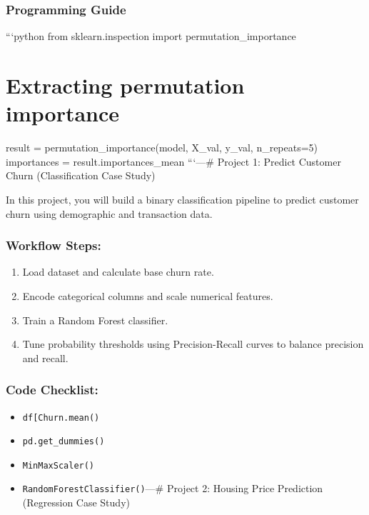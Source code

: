 \subsubsection{Programming Guide}\label{programming-guide-23}

```python from sklearn.inspection import permutation\_importance

\section{Extracting permutation
importance}\label{extracting-permutation-importance}

result = permutation\_importance(model, X\_val, y\_val, n\_repeats=5)
importances = result.importances\_mean ```\n\n---\n\n\# Project 1:
Predict Customer Churn (Classification Case Study)

In this project, you will build a binary classification pipeline to
predict customer churn using demographic and transaction data.

\subsubsection{Workflow Steps:}\label{workflow-steps}

\begin{enumerate}
\def\labelenumi{\arabic{enumi}.}
\tightlist
\item
  Load dataset and calculate base churn rate.
\item
  Encode categorical columns and scale numerical features.
\item
  Train a Random Forest classifier.
\item
  Tune probability thresholds using Precision-Recall curves to balance
  precision and recall.
\end{enumerate}

\subsubsection{Code Checklist:}\label{code-checklist}

\begin{itemize}
\tightlist
\item
  \texttt{df{[}\textquotesingle{}Churn\textquotesingle{}{]}.mean()}
\item
  \texttt{pd.get\_dummies()}
\item
  \texttt{MinMaxScaler()}
\item
  \texttt{RandomForestClassifier()}\n\n---\n\n\# Project 2: Housing
  Price Prediction (Regression Case Study)
\end{itemize}

